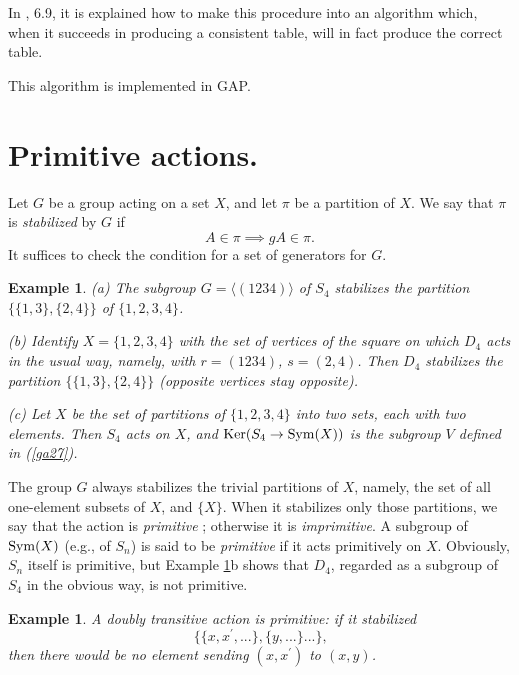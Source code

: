 \documentclass[a4paper,11pt,final,openany]{memoir}%
\newtheorem{example}[X]{Example}
\theoremstyle{nonumberplain}
\begin{document}
In \cite{artin1991}, 6.9, it is explained how to make this procedure into an
algorithm which, when it succeeds in producing a consistent table, will in
fact produce the correct table.

This algorithm is implemented in GAP.

\section{Primitive actions.}

Let $G$ be a group acting on a set $X$, and let $\pi$ be a partition of $X$.
We say that $\pi$ is \emph{stabilized\/}%
by $G$ if
\[
A\in\pi\implies gA\in\pi.
\]
It suffices to check the condition for a set of generators for $G$.

\begin{example}
\label{ga34} (a) The subgroup $G=\langle(1234)\rangle$ of $S_{4}$ stabilizes
the partition $\{\{1,3\},\{2,4\}\}$ of $\{1,2,3,4\}$.

(b) Identify $X=\{1,2,3,4\}$ with the set of vertices of the square on which
$D_{4}$ acts in the usual way, namely, with $r=(1234)$, $s=(2,4)$. Then
$D_{4}$ stabilizes the partition $\{\{1,3\},\{2,4\}\}$ (opposite vertices stay opposite).

(c) Let $X$ be the set of partitions of $\{1,2,3,4\}$ into two sets, each with
two elements. Then $S_{4}$ acts on $X$, and $\operatorname{Ker}(S_{4}\rightarrow\operatorname{Sym}(X))$ is
the subgroup $V$ defined in (\ref{ga27}).
\end{example}

The group $G$ always stabilizes the trivial partitions of $X$, namely, the set
of all one-element subsets of $X$, and $\{X\}$. When it stabilizes only those
partitions, we say that the action is \emph{primitive}%
%
; otherwise it is \emph{imprimitive}.%
A subgroup of $\operatorname{Sym}(X)$ (e.g., of $S_{n}$) is said to be \emph{primitive\/}%
if it acts primitively on $X$. Obviously, $S_{n}$ itself is primitive, but
Example \ref{ga34}b shows that $D_{4}$, regarded as a subgroup of $S_{4}$ in
the obvious way, is not primitive.

\begin{example}
\label{ga35} A doubly transitive action is primitive: if it stabilized
\[
\{\{x,x^{\prime},...\},\{y,...\}...\}\text{,}%
\]
then there would be no element sending $(x,x^{\prime})$ to $(x,y)$.
\end{example}
\end{document}
